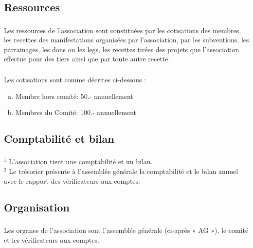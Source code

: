 \documentclass[12pt,a4paper,oneside]{article}
\newcounter{art}
\newcommand{\french}{    \switchcolumn[1]\noindent}
\newcounter{para}
\begin{document}
\begin{paracol}{2}
\newpage 

\french 
	\subsection{Ressources}


\french
	\subsubsection{}
	Les ressources de l’association sont constituées par les cotisations des membres, les recettes des manifestations organisées par l’association, par les subventions, les parrainages, les dons ou les legs, les recettes tirées des projets que l’association effectue pour des tiers ainsi que par toute autre recette.


\french
	\subsubsection{} 
	Les cotisations sont comme décrites ci-dessous :
	\begin{enumerate}[(a)]
	\item Membre hors comité: 50.- annuellement
	\item  Membres du Comité: 100.- annuellement
	\end{enumerate}


\french 
	\subsection{Comptabilité et bilan}
	\subsubsection{}

	$^1$ L’association tient une comptabilité et un bilan. \\
	$^2$ Le trésorier présente à l’assemblée générale la comptabilité et le bilan annuel avec le rapport des vérificateurs aux comptes.  


\french
	\subsection{Organisation}

\french
	\subsubsection{}
	Les organes de l’association sont l’assemblée générale (ci-après « AG »), le comité et les vérificateurs aux comptes.


\end{paracol}
\end{document}
